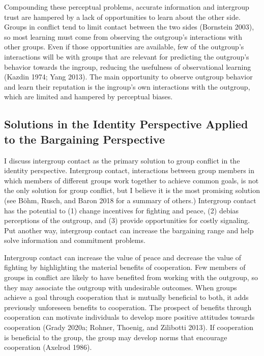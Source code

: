 \documentclass[11pt]{article}
\begin{document}
Compounding these perceptual problems, accurate information and
intergroup trust are hampered by a lack of opportunities to learn about
the other side. Groups in conflict tend to limit contact between the two
sides (Bornstein 2003), so most learning must come from observing the
outgroup's interactions with other groups. Even if those opportunities
are available, few of the outgroup's interactions will be with groups
that are relevant for predicting the outgroup's behavior towards the
ingroup, reducing the usefulness of observational learning (Kazdin 1974;
Yang 2013). The main opportunity to observe outgroup behavior and learn
their reputation is the ingroup's own interactions with the outgroup,
which are limited and hampered by perceptual biases.

\hypertarget{solutions-in-the-identity-perspective-applied-to-the-bargaining-perspective}{%
\subsection{Solutions in the Identity Perspective Applied to the
Bargaining
Perspective}\label{solutions-in-the-identity-perspective-applied-to-the-bargaining-perspective}}

I discuss intergroup contact as the primary solution to group conflict
in the identity perspective. Intergroup contact, interactions between
group members in which members of different groups work together to
achieve common goals, is not the only solution for group conflict, but I
believe it is the most promising solution (see Böhm, Rusch, and Baron
2018 for a summary of others.) Intergroup contact has the potential to
(1) change incentives for fighting and peace, (2) debias perceptions of
the outgroup, and (3) provide opportunities for costly signaling. Put
another way, intergroup contact can increase the bargaining range and
help solve information and commitment problems.

Intergroup contact can increase the value of peace and decrease the
value of fighting by highlighting the material benefits of cooperation.
Few members of groups in conflict are likely to have benefited from
working with the outgroup, so they may associate the outgroup with
undesirable outcomes. When groups achieve a goal through cooperation
that is mutually beneficial to both, it adds previously unforeseen
benefits to cooperation. The prospect of benefits through cooperation
can motivate individuals to develop more positive attitudes towards
cooperation (Grady 2020a; Rohner, Thoenig, and Zilibotti 2013). If
cooperation is beneficial to the group, the group may develop norms that
encourage cooperation (Axelrod 1986).
\end{document}

